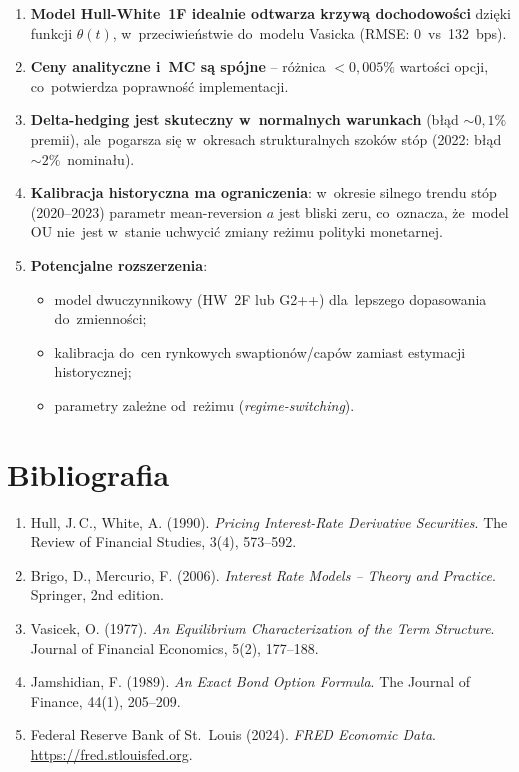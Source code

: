 \documentclass[12pt,a4paper]{article}
\begin{document}
\begin{enumerate}
  \item \textbf{Model Hull-White~1F idealnie odtwarza krzywą dochodowości}
        dzięki funkcji $\theta(t)$, w~przeciwieństwie do~modelu Vasicka
        (RMSE: 0~vs~132~bps).

  \item \textbf{Ceny analityczne i~MC są spójne} -- różnica $<0{,}005\%$
        wartości opcji, co~potwierdza poprawność implementacji.

  \item \textbf{Delta-hedging jest skuteczny w~normalnych warunkach}
        (błąd $\sim 0{,}1\%$ premii), ale~pogarsza się w~okresach
        strukturalnych szoków stóp (2022: błąd $\sim 2\%$~nominału).

  \item \textbf{Kalibracja historyczna ma ograniczenia}: w~okresie silnego
        trendu stóp (2020--2023) parametr mean-reversion $a$ jest bliski
        zeru, co~oznacza, że~model OU nie~jest w~stanie uchwycić zmiany
        reżimu polityki monetarnej.

  \item \textbf{Potencjalne rozszerzenia}:
        \begin{itemize}
          \item model dwuczynnikowy (HW~2F lub G2++) dla~lepszego
                dopasowania do~zmienności;
          \item kalibracja do~cen rynkowych swaptionów/capów zamiast
                estymacji historycznej;
          \item parametry zależne od~reżimu (\emph{regime-switching}).
        \end{itemize}
\end{enumerate}

\section*{Bibliografia}

\begin{enumerate}
  \item Hull, J.\,C., White, A. (1990). \textit{Pricing Interest-Rate
        Derivative Securities}. The Review of Financial Studies, 3(4),
        573--592.

  \item Brigo, D., Mercurio, F. (2006). \textit{Interest Rate Models --
        Theory and Practice}. Springer, 2nd edition.

  \item Vasicek, O. (1977). \textit{An Equilibrium Characterization of the
        Term Structure}. Journal of Financial Economics, 5(2), 177--188.

  \item Jamshidian, F. (1989). \textit{An Exact Bond Option Formula}.
        The Journal of Finance, 44(1), 205--209.

  \item Federal Reserve Bank of St.~Louis (2024). \textit{FRED Economic
        Data}. \url{https://fred.stlouisfed.org}.
\end{enumerate}
\end{document}
